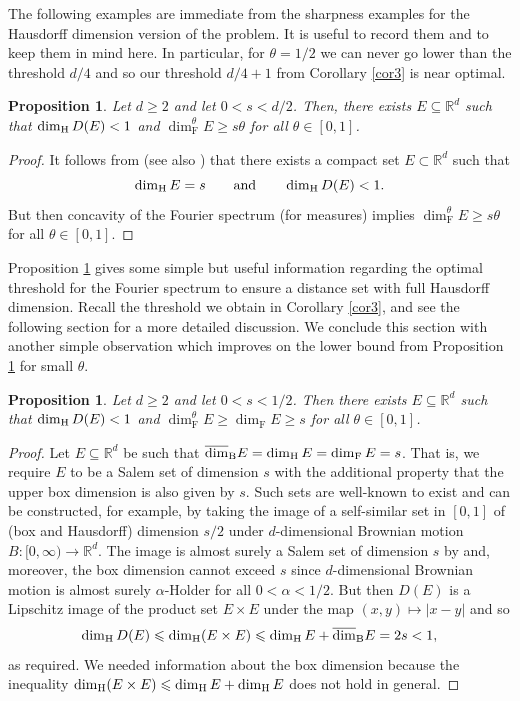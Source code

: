 \documentclass[11pt]{amsart}
\numberwithin{equation}{section}
\newcommand{\rd}{\mathbb{R}^d}
\renewcommand{\ge}{\geqslant}
\renewcommand{\geq}{\geqslant}
\renewcommand{\leq}{\leqslant}
\newcommand{\ubd}{\overline{\dim}_{\textup{B}}}
\newcommand{\hd}{\dim_{\textup{H}}}
\newcommand{\fs}{\dim^\theta_{\mathrm{F}}}
\newcommand{\fd}{\dim_{\mathrm{F}}}
\newtheorem{proposition}[theorem]{Proposition}
\theoremstyle{plain}
\theoremstyle{remark}
\newcommand{\R}{\mathbb{R}}
\begin{document}
The following examples are immediate from the sharpness examples for the Hausdorff dimension version of the problem.  It is useful to record them and to keep them in mind here.  In particular, for $\theta=1/2$ we can never go lower than the threshold $d/4$ and so our threshold $d/4+1$ from Corollary \ref{cor3} is near optimal.  
\begin{proposition}\label{prop:64}
Let $d\ge 2$ and let $0<s<d/2$. Then, there exists $E \subseteq \rd$ such that $\hd D(E)<1$ and $\fs E \geq s \theta$ for all $\theta \in [0,1]$.
\end{proposition}

\begin{proof}
It follows from \cite{distance} (see also \cite[Example 4.8]{mattila}) that there exists a compact set $E\subset \R^d$ such that
\[
\hd E=s
\qquad\text{and}\qquad
\hd D(E)< 1.
\]
But then concavity of the Fourier spectrum (for measures) implies $\fs E \geq s \theta$ for all $\theta \in [0,1]$.
\end{proof}



Proposition \ref{prop:64} gives some simple but useful information regarding the optimal threshold for the Fourier spectrum to ensure a distance set with full Hausdorff dimension.  Recall the threshold we obtain in Corollary \ref{cor3}, and see the following section for a more detailed discussion.  We conclude this section with another simple observation which improves on the lower bound from Proposition \ref{prop:64} for small $\theta$.

\begin{proposition} \label{prop:easy1/2}
    Let $d\geq 2$ and let $0<s<1/2$.  Then there exists $E \subseteq \rd$ such that $\hd D(E)<1$ and $\fs E \geq \fd E \geq s$ for all $\theta \in [0,1]$.
\end{proposition}
\begin{proof}
    Let $E \subseteq \rd$ be such that $\ubd E = \hd E = \fd E = s$.  That is, we require $E$ to be a Salem set of dimension $s$ with the additional property that the upper box dimension is also given by $s$.  Such sets are well-known to exist and can be constructed, for example, by taking the image of a self-similar set in $[0,1]$ of (box and Hausdorff) dimension $s/2$ under $d$-dimensional Brownian motion $B: [0,\infty) \to \rd$. The image is almost surely a Salem set of dimension $s$ by \cite[Theorem 1, Chapter 17]{kahane} and, moreover, the box dimension cannot exceed $s$ since $d$-dimensional Brownian motion  is almost surely $\alpha$-Holder for all $0<\alpha<1/2$.  But then
    $D(E)$ is a Lipschitz image of the product set $E \times E$ under the map $(x,y) \mapsto |x-y|$ and so 
    \[
    \hd D(E) \leq \hd (E \times E) \leq \hd E + \ubd E = 2s<1,
    \]
    as required. We needed information about the box dimension because the inequality $\hd (E \times E) \leq \hd E + \hd E $ does not hold in general.
\end{proof}
\end{document}

